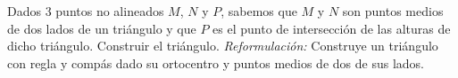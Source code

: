 Dados $3$ puntos no alineados $M$, $N$ y $P$, sabemos que $M$ y $N$ son puntos medios de dos lados de un triángulo y que $P$ es el punto de intersección de las alturas de dicho triángulo. Construir el triángulo. \newline 
\emph{Reformulación:} Construye un triángulo con regla y compás dado su ortocentro y puntos medios de dos de sus lados.
